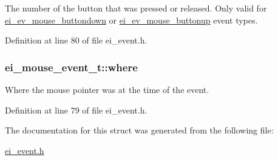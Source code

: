 The number of the button that was pressed or released. Only valid for \hyperlink{ei__event_8h_a132dde064150d861ad24e9d839cbe007ae75b2b6a8423d54c46a418d222e0af66}{ei\-\_\-ev\-\_\-mouse\-\_\-buttondown} or \hyperlink{ei__event_8h_a132dde064150d861ad24e9d839cbe007aabd9931e36fb3628cc044a2aafc2c7e4}{ei\-\_\-ev\-\_\-mouse\-\_\-buttonup} event types. 



Definition at line 80 of file ei\-\_\-event.\-h.

\hypertarget{structei__mouse__event__t_ac50f216f7af2a99469bd39cebc309af5}{
\subsubsection[{where}]{ ei\-\_\-mouse\-\_\-event\-\_\-t\-::where}}\label{structei__mouse__event__t_ac50f216f7af2a99469bd39cebc309af5}


Where the mouse pointer was at the time of the event. 



Definition at line 79 of file ei\-\_\-event.\-h.



The documentation for this struct was generated from the following file\-:\begin{DoxyCompactItemize}
\item 
\hyperlink{ei__event_8h}{ei\-\_\-event.\-h}\end{DoxyCompactItemize}
